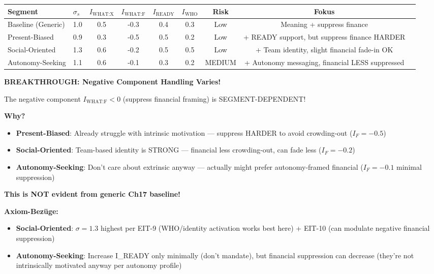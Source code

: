 \begin{center}
\small
\renewcommand{\arraystretch}{1.3}
\begin{tabular}{@{}llccccccc@{}}
\toprule
\textbf{Segment} & \textbf{$\sigma_s$} & $I_{\text{WHAT:X}}$ & $I_{\text{WHAT:F}}$ & $I_{\text{READY}}$ & $I_{\text{WHO}}$ & \textbf{Risk} & \textbf{Fokus} \\
\midrule
Baseline (Generic) & 1.0 & 0.5 & -0.3 & 0.4 & 0.3 & Low & Meaning + suppress finance \\
Present-Biased & 0.9 & 0.3 & -0.5 & 0.5 & 0.2 & Low & + READY support, but suppress finance HARDER \\
Social-Oriented & 1.3 & 0.6 & -0.2 & 0.5 & 0.5 & Low & + Team identity, slight financial fade-in OK \\
Autonomy-Seeking & 1.1 & 0.6 & -0.1 & 0.3 & 0.2 & MEDIUM & + Autonomy messaging, financial LESS suppressed \\
\bottomrule
\end{tabular}
\end{center}

\textbf{BREAKTHROUGH: Negative Component Handling Varies!}

\begin{tcolorbox}[colback=orange!5!white, colframe=orange!75!black, title=\textbf{EIT-10 Axiom Over Segments (Neu!)}]

The negative component $I_{\text{WHAT:F}} < 0$ (suppress financial framing) is SEGMENT-DEPENDENT!

\textbf{Why?}
\begin{itemize}[nosep]
\item \textbf{Present-Biased}: Already struggle with intrinsic motivation — suppress HARDER to avoid crowding-out ($I_F = -0.5$)
\item \textbf{Social-Oriented}: Team-based identity is STRONG — financial less crowding-out, can fade less ($I_F = -0.2$)
\item \textbf{Autonomy-Seeking}: Don't care about extrinsic anyway — actually might prefer autonomy-framed financial ($I_F = -0.1$ minimal suppression)
\end{itemize}

\textbf{This is NOT evident from generic Ch17 baseline!}

\end{tcolorbox}

\textbf{Axiom-Bezüge:}
\begin{itemize}[nosep]
\item \textbf{Social-Oriented}: $\sigma = 1.3$ highest per EIT-9 (WHO/identity activation works best here) + EIT-10 (can modulate negative financial suppression)
\item \textbf{Autonomy-Seeking}: Increase I_READY only minimally (don't mandate), but financial suppression can decrease (they're not intrinsically motivated anyway per autonomy profile)
\end{itemize}

